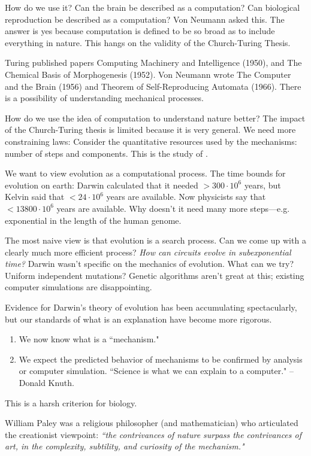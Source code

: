 How do we use it? Can the brain be described as a computation? Can biological reproduction be described as a computation? Von  Neumann asked this. The answer is yes because computation is defined to be so broad as to include everything in nature. This hangs on the validity of the Church-Turing Thesis.

Turing published papers Computing Machinery and Intelligence (1950), and The Chemical Basis of Morphogenesis (1952). Von Neumann wrote The Computer and the Brain (1956) and Theorem of Self-Reproducing Automata (1966). There is a possibility of understanding mechanical processes.

How do we use the idea of computation to understand nature better? The impact of the Church-Turing thesis is limited because it is very general. We need more constraining laws: Consider the quantitative resources used by the mechanisms: number of steps and components. This is the study of .


We want to view evolution as a computational process. The time bounds for evolution on earth: Darwin calculated that it needed $>300\cdot 10^6$ years, but Kelvin said that $<24\cdot 10^6$ years are available. Now physicists say that $<13800\cdot 10^6$ years are available. Why doesn't it need many more steps---e.g. exponential in the length of the human genome.

The most naive view is that evolution is a search process. Can we come up with a clearly much more efficient process? {\it How can circuits evolve in subexponential time?} Darwin wasn't specific on the mechanics of evolution. What can we try? Uniform independent mutations? Genetic algorithms aren't great at this; existing computer simulations are disappointing.

Evidence for Darwin's theory of evolution has been accumulating spectacularly, but our standards of what is an explanation have become more rigorous.
\begin{enumerate}
\item
We now know what is a ``mechanism."
\item
We expect the predicted behavior of mechanisms to be confirmed by analysis or computer simulation. ``Science is what we can explain to a computer." --Donald Knuth.
\end{enumerate}
This is a harsh criterion for biology.

William Paley was a religious philosopher (and mathematician) who articulated the creationist viewpoint: {\it ``the contrivances of nature surpass the contrivances of art, in the complexity, subtility, and curiosity of the mechanism."}

